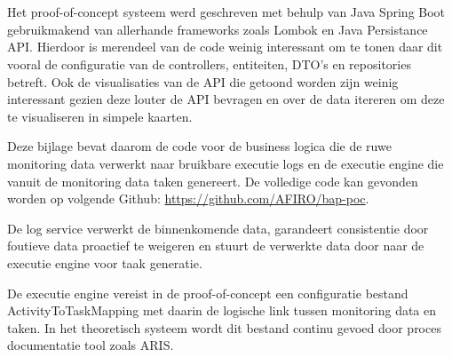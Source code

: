 
\chapter{}%
\label{ch:code}
Het proof-of-concept systeem werd geschreven met behulp van Java Spring Boot gebruikmakend van allerhande frameworks zoals Lombok en Java Persistance API. Hierdoor is merendeel van de code weinig interessant om te tonen daar dit vooral de configuratie van de controllers, entiteiten, DTO's en repositories betreft. Ook de visualisaties van de API die getoond worden zijn weinig interessant gezien deze louter de API bevragen en over de data itereren om deze te visualiseren in simpele kaarten. \newline

Deze bijlage bevat daarom de code voor de business logica die de ruwe monitoring data verwerkt naar bruikbare executie logs en de executie engine die vanuit de monitoring data taken genereert. De volledige code kan gevonden worden op volgende Github: \url{https://github.com/AFIRO/bap-poc}. \newline

De log service verwerkt de binnenkomende data, garandeert consistentie door foutieve data proactief te weigeren en stuurt de verwerkte data door naar de executie engine voor taak generatie.\newline

De executie engine vereist in de proof-of-concept een configuratie bestand ActivityToTaskMapping met daarin de logische link tussen monitoring data en taken. In het theoretisch systeem wordt dit bestand continu gevoed door proces documentatie tool zoals ARIS. \newline

